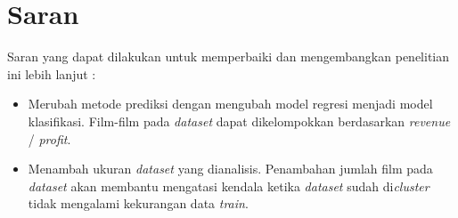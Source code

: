 \section{Saran}
Saran yang dapat dilakukan untuk memperbaiki dan mengembangkan penelitian ini lebih lanjut : 


\begin{itemize}
\item Merubah metode prediksi dengan mengubah model regresi menjadi model klasifikasi. Film-film pada \textit{dataset} dapat dikelompokkan berdasarkan \textit{revenue} / \textit{profit}.  


\item Menambah ukuran \textit{dataset} yang dianalisis. Penambahan jumlah film pada \textit{dataset} akan membantu mengatasi kendala ketika \textit{dataset} sudah di\textit{cluster} tidak mengalami kekurangan data \textit{train}.

\end{itemize}